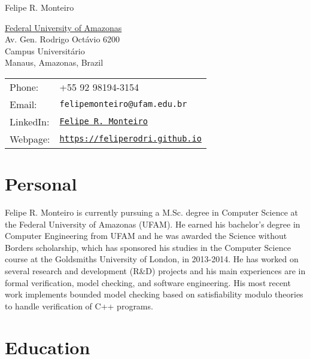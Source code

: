 \documentclass[letterpaper]{article}
\def\name{Felipe R. Monteiro}
\begin{document}
{\huge \name}


\vspace{0.25in}

\begin{minipage}{0.45\linewidth}
  \href{https://ufam.edu.br}{Federal University of Amazonas} \\
  Av. Gen. Rodrigo Oct\'avio 6200 \\
 Campus Universit\'ario \\
  Manaus, Amazonas, Brazil
\end{minipage}
\hfill
\begin{minipage}{0.45\linewidth}
  \begin{tabular}{ll}
    Phone: & +55 92 98194-3154 \\
    Email: & {\tt felipemonteiro@ufam.edu.br} \\
    LinkedIn: & \href{https://www.linkedin.com/in/felipe-r-monteiro-91643157/}{\tt Felipe R. Monteiro} \\
    Webpage: & \href{https://feliperodri.github.io}{\tt https://feliperodri.github.io} \\
  \end{tabular}
\end{minipage}

\section*{Personal}

Felipe R. Monteiro is currently pursuing a M.Sc. degree in Computer Science at the Federal University of Amazonas (UFAM). He earned his bachelor's degree in Computer Engineering from UFAM and he was awarded the Science without Borders scholarship, which has sponsored his studies in the Computer Science course at the Goldsmiths University of London, in 2013-2014. He has worked on several research and development (R\&D) projects and his main experiences are in formal verification, model checking, and software engineering. His most recent work implements bounded model checking based on satisfiability modulo theories to handle verification of C++ programs.

\section*{Education}
\end{document}
